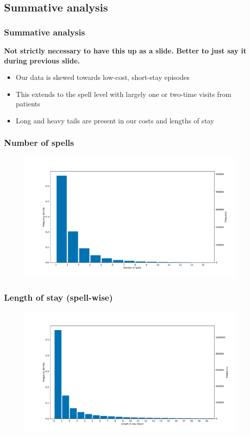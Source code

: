 \documentclass{beamer}
\begin{document}
\subsection{Summative analysis}
\begin{frame}
    \frametitle{Summative analysis}
    \textbf{Not strictly necessary to have this up as a slide. Better to just
    say it during previous slide.}
    \begin{itemize}
        \pause%
        \item Our data is skewed towards low-cost, short-stay episodes
        \pause%
        \item This extends to the spell level with largely one or two-time
            visits from patients
        \pause%
        \item Long and heavy tails are present in our costs and lengths of stay
    \end{itemize}
\end{frame}

\begin{frame}
    \frametitle{Number of spells}

    \begin{figure}
    \includegraphics[width=\linewidth]{./img/no_spells_hist.pdf}
    \end{figure}
\end{frame}

\begin{frame}
    \frametitle{Length of stay (spell-wise)}

    \begin{figure}
    \includegraphics[width=\linewidth]{./img/LOS_hist.pdf}
    \end{figure}
\end{frame}
\end{document}
